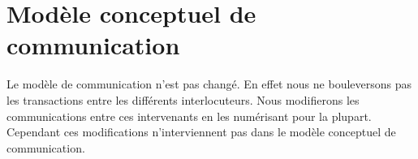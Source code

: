\section{Modèle conceptuel de communication}

Le modèle de communication n'est pas changé. En effet nous ne bouleversons pas
les transactions entre les différents interlocuteurs. Nous modifierons les 
communications entre ces intervenants en les numérisant pour la plupart.
Cependant ces modifications n'interviennent pas dans le modèle conceptuel
de communication.
